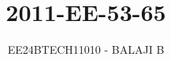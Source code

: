 \documentclass[journal]{IEEEtran}
\begin{document}

\vspace{3cm}

\title{2011-EE-53-65}
\author{EE24BTECH11010 - BALAJI B}
{\let\newpage\relax\maketitle}

\renewcommand{\thefigure}{\theenumi}
\renewcommand{\thetable}{\theenumi}
\setlength{\intextsep}{10pt} %


\renewcommand{\thetable}{\theenumi}
\end{document}
